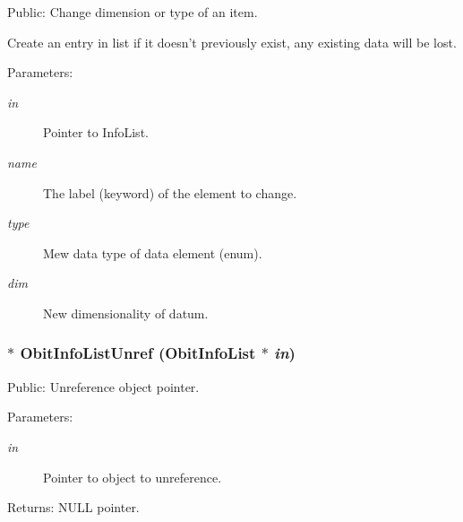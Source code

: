 Public: Change dimension or type of an item. 

Create an entry in list if it doesn't previously exist, any existing data will be lost. \begin{Desc}
\item[Parameters:]
\begin{description}
\item[{\em in}]Pointer to Info\-List. \item[{\em name}]The label (keyword) of the element to change. \item[{\em type}]Mew data type of data element (enum). \item[{\em dim}]New dimensionality of datum. \end{description}
\end{Desc}
\subsubsection{$\ast$ Obit\-Info\-List\-Unref ({\bf Obit\-Info\-List} $\ast$ {\em in})}\label{ObitInfoList_8h_a4}


Public: Unreference object pointer. 

\begin{Desc}
\item[Parameters:]
\begin{description}
\item[{\em in}]Pointer to object to unreference. \end{description}
\end{Desc}
\begin{Desc}
\item[Returns:]NULL pointer. \end{Desc}
